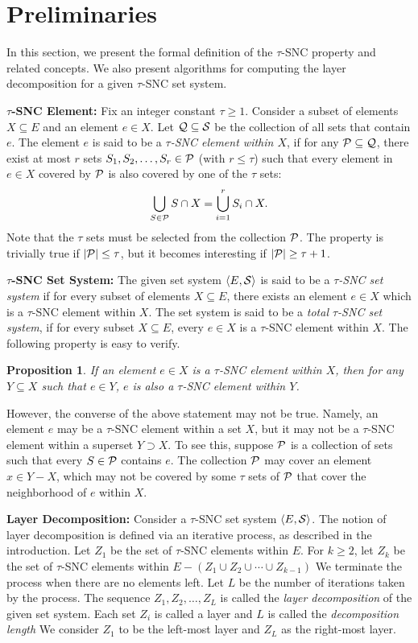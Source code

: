 \documentclass[11pt]{article}
\newtheorem{proposition}[theorem]{\bf Proposition}
\newcommand{\calP} {{\cal P}}
\newcommand{\calQ} {{\cal Q}}
\newcommand{\calS} {{\cal S}}
\newcommand{\pair}[2] {\langle #1, #2\rangle}
\begin{document}
\section{Preliminaries}
In this section, we present the formal definition of the $\tau$-SNC property and related concepts.
We also present algorithms for computing the layer decomposition for a given $\tau$-SNC set system.

{\bf $\tau$-SNC Element: }Fix an integer constant $\tau\geq 1$. Consider a subset of elements $X\subseteq E$ and an element $e\in X$.
Let $\calQ\subseteq \calS$ be the collection of all sets that contain $e$.
The element $e$ is said to be a {\em $\tau$-SNC element within $X$}, 
if for any $\calP \subseteq \calQ$,
there exist at most $r$ sets $S_1, S_2, \ldots, S_r\in \calP$ (with $r\leq \tau$)
such that every element in $e\in X$ covered by $\calP$ is also covered by one of the $\tau$ sets:
\[
\bigcup_{S\in \calP} S\cap X = \bigcup_{i=1}^r S_i\cap X.
\]
Note that the $\tau$ sets must be selected from the collection $\calP$.
The property is trivially true if $|\calP|\leq \tau$, but it becomes interesting if $|\calP|\geq \tau+1$.

{\bf $\tau$-SNC Set System: }The given set system $\pair{E}{\calS}$ is said to be a {\em $\tau$-SNC set system}
if for every subset of elements $X\subseteq E$, there exists an element $e\in X$
which is a $\tau$-SNC element within $X$. 
The set system is said to be a {\em total $\tau$-SNC set system},
if for every subset $X\subseteq E$, every $e\in X$ is a $\tau$-SNC element within $X$.
The following property is easy to verify.

\begin{proposition}
\label{prop:AAA}
If an element $e\in X$ is a $\tau$-SNC element within $X$, then for any $Y\subseteq X$ such that $e\in Y$,
$e$ is also a $\tau$-SNC element within $Y$.
\end{proposition}

However, the converse of the above statement may not be true.
Namely, an element $e$ may be a $\tau$-SNC element within a set $X$, but it may not be a $\tau$-SNC element
within a superset $Y\supset X$. To see this, suppose $\calP$ is a collection of sets 
such that every $S\in \calP$ contains $e$.
The collection $\calP$ may cover an element $x\in Y-X$,
which may not be covered by some $\tau$ sets of $\calP$ that cover the neighborhood of $e$ within $X$.

{\bf Layer Decomposition: }
Consider a $\tau$-SNC set system $\pair{E}{\calS}$.
The notion of layer decomposition is defined via an iterative process, as described in the introduction.
Let $Z_1$ be the set of $\tau$-SNC elements within $E$.
For $k\geq 2$, let $Z_k$ be the set of $\tau$-SNC elements within $E-(Z_1\cup Z_2\cup \cdots \cup Z_{k-1})$
We terminate the process when there are no elements left. Let $L$ be the number of iterations taken by the process.
The sequence $Z_1, Z_2, \ldots, Z_L$ is called the {\em layer decomposition} of the given set system.
Each set $Z_i$ is called a layer and $L$ is called the {\em decomposition length}
We consider $Z_1$ to be the left-most layer and $Z_L$ as the right-most layer.
\end{document}
